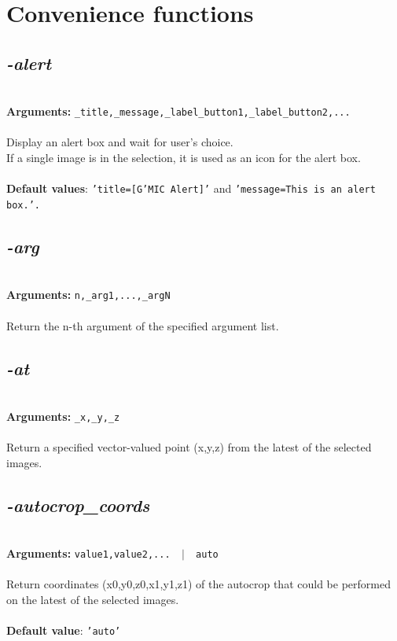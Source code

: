 \documentclass[a4paper,11pt,twoside]{book}
\begin{document}
\section{Convenience functions}


\subsection{\emph{-alert} }\vspace*{-0.5em}
~\\\textbf{Arguments: } 
{\small \texttt{\_title,\_message,\_label\_button1,\_label\_button2,...}}\\~\\
Display an alert box and wait for user's choice.
~\\If a single image is in the selection, it is used as an icon for the alert box.
~\\~\\\textbf{Default values}: {\small \texttt{'title=[G'MIC Alert]'} and \texttt{'message=This is an alert box.'.}}


\subsection{\emph{-arg} }\vspace*{-0.5em}
~\\\textbf{Arguments: } 
{\small \texttt{n,\_arg1,...,\_argN}}\\~\\
Return the n-th argument of the specified argument list.


\subsection{\emph{-at} }\vspace*{-0.5em}
~\\\textbf{Arguments: } 
{\small \texttt{\_x,\_y,\_z}}\\~\\
Return a specified vector-valued point (x,y,z) from the latest of the selected images.


\subsection{\emph{-autocrop\_coords} }\vspace*{-0.5em}
~\\\textbf{Arguments: } 
{\small \texttt{value1,value2,... ~$|$~ auto}}\\~\\
Return coordinates (x0,y0,z0,x1,y1,z1) of the autocrop that could be performed on the latest of the selected images.
~\\~\\\textbf{Default value}: {\small \texttt{'auto'}}
\end{document}
